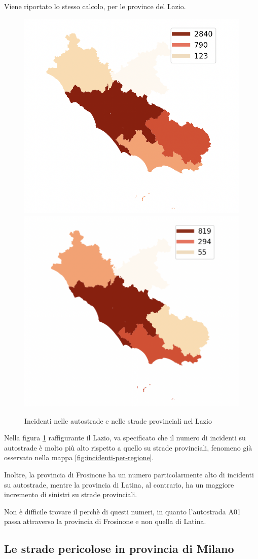\documentclass[a4paper,12pt]{report}
\begin{document}
Viene riportato lo stesso calcolo, per le province del Lazio.

\begin{figure}
    \includegraphics[width=0.5\linewidth]{../src/provincia/lazio_autostrade.png}
    \includegraphics[width=0.5\linewidth]{../src/provincia/lazio_strade_prov.png}
    \caption{Incidenti nelle autostrade e nelle strade provinciali nel Lazio}
    \label{fig:lazio-strade}
\end{figure}

Nella figura \ref{fig:lazio-strade} raffigurante il Lazio, va specificato che il numero 
di incidenti su autostrade è molto più alto rispetto a quello su strade provinciali, 
fenomeno già osservato nella mappa \ref{fig:incidenti-per-regione}.

Inoltre, la provincia di Frosinone ha un numero particolarmente alto di incidenti su 
autostrade, mentre la provincia di Latina, al contrario, ha un maggiore incremento di 
sinistri su strade provinciali.

Non è difficile trovare il perchè di questi numeri, in quanto l'autostrada A01 passa 
attraverso la provincia di Frosinone e non quella di Latina.

\subsection{Le strade pericolose in provincia di Milano}
\end{document}
